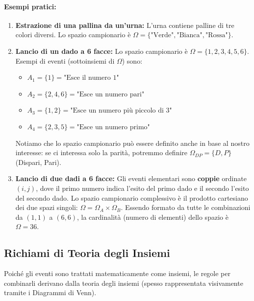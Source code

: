 \documentclass[12pt, a4paper]{article}
\begin{document}
\paragraph{Esempi pratici:}
\begin{enumerate}
    \item \textbf{Estrazione di una pallina da un'urna:} L'urna contiene palline di tre colori diversi. Lo spazio campionario è $\Omega = \{\text{"Verde"}, \text{"Bianca"}, \text{"Rossa"}\}$.
    \item \textbf{Lancio di un dado a 6 facce:} Lo spazio campionario è $\Omega = \{1, 2, 3, 4, 5, 6\}$. Esempi di eventi (sottoinsiemi di $\Omega$) sono:
    \begin{itemize}
        \item $A_1 = \{1\} = \text{"Esce il numero 1"}$ 
        \item $A_2 = \{2, 4, 6\} = \text{"Esce un numero pari"}$ 
        \item $A_3 = \{1, 2\} = \text{"Esce un numero più piccolo di 3"}$ 
        \item $A_4 = \{2, 3, 5\} = \text{"Esce un numero primo"}$ 
    \end{itemize}
    Notiamo che lo spazio campionario può essere definito anche in base al nostro interesse: se ci interessa solo la parità, potremmo definire $\Omega_{DP} = \{D, P\}$ (Dispari, Pari).
    
    \item \textbf{Lancio di due dadi a 6 facce:} Gli eventi elementari sono \textbf{coppie} ordinate $(i,j)$, dove il primo numero indica l'esito del primo dado e il secondo l'esito del secondo dado. Lo spazio campionario complessivo è il prodotto cartesiano dei due spazi singoli: $\Omega = \Omega_A \times \Omega_B$. Essendo formato da tutte le combinazioni da $(1,1)$ a $(6,6)$, la cardinalità (numero di elementi) dello spazio è $\Omega = 36$.
\end{enumerate}

\subsection{Richiami di Teoria degli Insiemi}
Poiché gli eventi sono trattati matematicamente come insiemi, le regole per combinarli derivano dalla teoria degli insiemi (spesso rappresentata visivamente tramite i Diagrammi di Venn).
\end{document}
